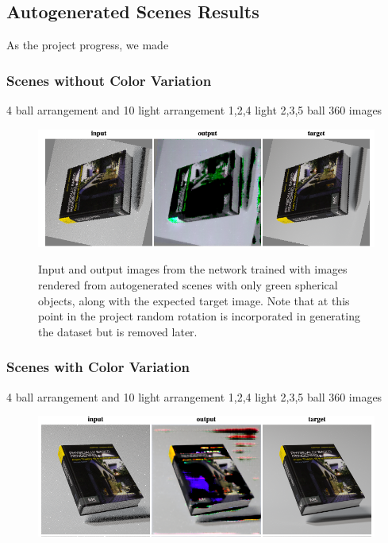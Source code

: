 \documentclass[acmsmall]{acmart}
\begin{document}
\subsection{Autogenerated Scenes Results}
\label{subsec:auto_scenes}

As the project progress, we made
\subsubsection{Scenes without Color Variation}
\label{subsubsec:no_texture}
4 ball arrangement and 10 light arrangement 1,2,4 light 2,3,5 ball
360 images

\begin{figure}[ht!]
	\includegraphics[width=\textwidth]{images/experiment1.png}
	\label{f:exp1}
	\caption{Input and output images from the network trained with images rendered from autogenerated scenes with only green spherical objects, along with the expected target image. Note that at this point in the project random rotation is incorporated in generating the dataset but is removed later.}
\end{figure}

\subsubsection{Scenes with Color Variation}
\label{subsubsec:with_color}
4 ball arrangement and 10 light arrangement 1,2,4 light 2,3,5 ball
360 images

\begin{figure}[ht!]
	\includegraphics[width=\textwidth]{images/experiment2.png}
	\label{f:exp1}
\end{figure}
\end{document}
